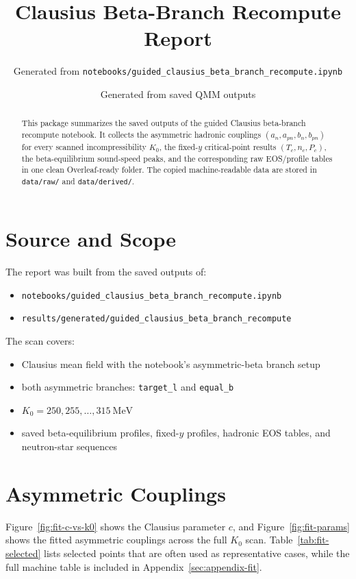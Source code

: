 \documentclass[11pt]{article}
\title{Clausius Beta-Branch Recompute Report}
\author{Generated from \texttt{notebooks/guided\_clausius\_beta\_branch\_recompute.ipynb}}
\date{Generated from saved QMM outputs}
\begin{document}
\maketitle

\begin{abstract}
This package summarizes the saved outputs of the guided Clausius
beta-branch recompute notebook. It collects the asymmetric hadronic
couplings $(a_n, a_{pn}, b_n, b_{pn})$ for every scanned
incompressibility $K_0$, the fixed-$y$ critical-point results
$(T_c, n_c, P_c)$, the beta-equilibrium sound-speed peaks, and the
corresponding raw EOS/profile tables in one clean Overleaf-ready folder.
The copied machine-readable data are stored in \texttt{data/raw/} and
\texttt{data/derived/}.
\end{abstract}

\section{Source and Scope}
The report was built from the saved outputs of:
\begin{itemize}
\item \texttt{notebooks/guided\_clausius\_beta\_branch\_recompute.ipynb}
\item \texttt{results/generated/guided\_clausius\_beta\_branch\_recompute}
\end{itemize}

The scan covers:
\begin{itemize}
\item Clausius mean field with the notebook's asymmetric-beta branch setup
\item both asymmetric branches: \texttt{target\_l} and \texttt{equal\_b}
\item $K_0 = 250, 255, \ldots, 315~\mathrm{MeV}$
\item saved beta-equilibrium profiles, fixed-$y$ profiles, hadronic EOS tables,
      and neutron-star sequences
\end{itemize}

\section{Asymmetric Couplings}
Figure~\ref{fig:fit-c-vs-k0} shows the Clausius parameter $c$, and
Figure~\ref{fig:fit-params} shows the fitted asymmetric couplings across
the full $K_0$ scan. Table~\ref{tab:fit-selected} lists selected points
that are often used as representative cases, while the full machine table
is included in Appendix~\ref{sec:appendix-fit}.
\end{document}
